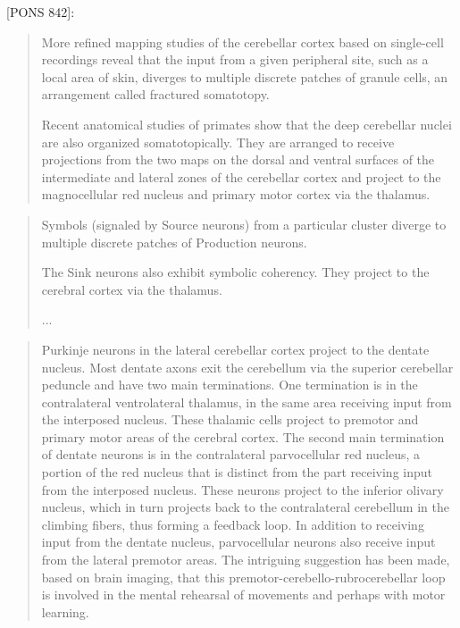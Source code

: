 \documentclass{article}
\begin{document}
[PONS 842]:
\begin{quote}
  More refined mapping studies of the cerebellar cortex based on
  single-cell recordings reveal that the input from a given peripheral
  site, such as a local area of skin, diverges to multiple discrete
  patches of granule cells, an arrangement called fractured
  somatotopy.

Recent anatomical studies of primates show that the deep cerebellar
nuclei are also organized somatotopically. They are arranged to
receive projections from the two maps on the dorsal and ventral
surfaces of the intermediate and lateral zones of the cerebellar
cortex and project to the magnocellular red nucleus and primary motor
cortex via the thalamus.
\end{quote}

\begin{quote}
  Symbols (signaled by Source neurons) from a particular cluster
  diverge to multiple discrete patches of Production neurons.

  The Sink neurons also exhibit symbolic coherency. They project to
  the cerebral cortex via the thalamus.

...

\end{quote}

\begin{quote}
  Purkinje neurons in the lateral cerebellar cortex project to the
  dentate nucleus. Most dentate axons exit the cerebellum via the
  superior cerebellar peduncle and have two main terminations. One
  termination is in the contralateral ventrolateral thalamus, in the
  same area receiving input from the interposed nucleus. These
  thalamic cells project to premotor and primary motor areas of the
  cerebral cortex. The second main termination of dentate neurons is
  in the contralateral parvocellular red nucleus, a portion of the red
  nucleus that is distinct from the part receiving input from the
  interposed nucleus. These neurons project to the inferior olivary
  nucleus, which in turn projects back to the contralateral cerebellum
  in the climbing fibers, thus forming a feedback loop. In addition to
  receiving input from the dentate nucleus, parvocellular neurons also
  receive input from the lateral premotor areas. The intriguing
  suggestion has been made, based on brain imaging, that this
  premotor-cerebello-rubrocerebellar loop is involved in the mental
  rehearsal of movements and perhaps with motor learning.
\end{quote}
\end{document}
